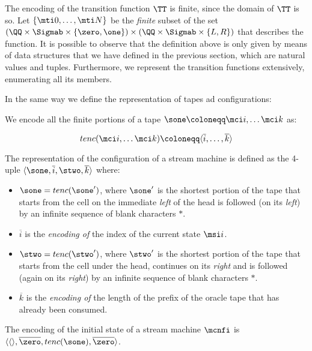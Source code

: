 The encoding of the transition function $\TT$ is finite, since the domain of $\TT$ is so. Let $\{\mti 0, \ldots, \mti N\}$ be the \emph{finite} subset of the set $(\QQ \times \Sigmab  \times \{\zero, \one\}) \times(\QQ \times \Sigmab \times \{L, R\})$ that describes the function. It is possible to observe that the definition above is only given by means of data structures that we have defined in the previous section, which are natural values and tuples. Furthermore, we represent the transition functions extensively, enumerating all its members.

In the same way we define the representation of tapes ad configurations:

\begin{defn}
We encode all the finite portions of a tape $\sone \coloneqq \mci i, \ldots \mci k$ as:

\[
tenc(\mci i, \ldots \mci k)\coloneqq\langle \overline i, \ldots, \overline k\rangle
\]

\end{defn}

\begin{defn}
\label{defn:confencoding}
The representation of the configuration of a stream machine is defined as the 4-uple $\langle \sone, \overline i, \stwo, \overline k\rangle$ where:
\begin{itemize}
\item $\sone=tenc(\sone')$, where $\sone'$ is the shortest portion of the tape that starts from the cell on the immediate \emph{left} of the head is followed (on its \emph{left}) by an infinite sequence of blank characters $*$.
\item $\overline i$ is the \emph{encoding of} the index of the current state $\msi i$.
\item $\stwo=tenc(\stwo')$, where $\stwo'$ is the shortest portion of the tape that starts from the cell under the head, continues on its \emph{right} and is followed (again on its \emph{right}) by an infinite sequence of blank characters $*$.
\item $\overline k$ is the \emph{encoding of} the length of the prefix of the oracle tape that has already been consumed.
\end{itemize}
\end{defn}

\begin{remark}
The encoding of the initial state of a stream machine $\mcnfi$ is $\langle \langle\rangle, \overline \zero, tenc(\sone), \overline \zero\rangle$.
\end{remark}

